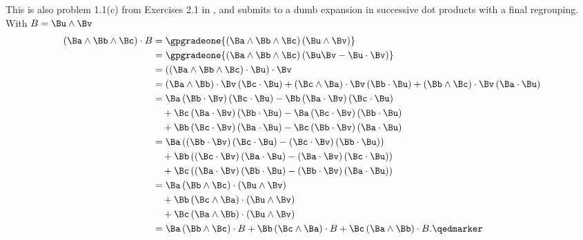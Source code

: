 This is also problem 1.1(c) from Exercises 2.1 in \citep{hestenes1999nfc}, and submits to a dumb expansion in successive dot products with a final regrouping.  With \(B = \Bu \wedge \Bv\)
%
\begin{equation}\label{eqn:stokesTheoremGeometricAlgebra:2860}
\begin{aligned}
\left(  \Ba \wedge \Bb \wedge \Bc  \right)
\cdot B
&=
\gpgradeone{
\left(  \Ba \wedge \Bb \wedge \Bc \right)
 \left( \Bu \wedge \Bv \right) } \\
&=
\gpgradeone{
\left(  \Ba \wedge \Bb \wedge \Bc  \right)
\left(
\Bu \Bv
- \Bu \cdot \Bv
\right) } \\
&=
\left(
\left(  \Ba \wedge \Bb \wedge \Bc  \right)
 \cdot \Bu \right) \cdot \Bv \\
&=
\left( \Ba \wedge \Bb \right) \cdot \Bv \left( \Bc \cdot \Bu \right)
+
\left( \Bc \wedge \Ba \right) \cdot \Bv \left( \Bb \cdot \Bu \right)
+
\left( \Bb \wedge \Bc \right) \cdot \Bv \left( \Ba \cdot \Bu \right) \\
&=
\Ba
\left(  \Bb \cdot \Bv  \right)
\left( \Bc \cdot \Bu \right)
-\Bb
\left(  \Ba \cdot \Bv  \right)
\left( \Bc \cdot \Bu \right) \\
&\quad +
\Bc
\left(  \Ba \cdot \Bv  \right)
\left( \Bb \cdot \Bu \right)
-
\Ba
\left(  \Bc \cdot \Bv  \right)
\left( \Bb \cdot \Bu \right) \\
&\quad +
\Bb
\left(  \Bc \cdot \Bv  \right)
\left( \Ba \cdot \Bu \right)
-
\Bc
\left(  \Bb \cdot \Bv  \right)
\left( \Ba \cdot \Bu \right) \\
&=
\Ba
\left(  \left(  \Bb \cdot \Bv  \right) \left( \Bc \cdot \Bu \right) - \left(  \Bc \cdot \Bv  \right) \left( \Bb \cdot \Bu \right)  \right)
\\
&\quad +
\Bb
\left(  \left(  \Bc \cdot \Bv  \right) \left( \Ba \cdot \Bu \right) - \left(  \Ba \cdot \Bv  \right) \left( \Bc \cdot \Bu \right)  \right)
\\
&\quad +
\Bc
\left(  \left(  \Ba \cdot \Bv  \right) \left( \Bb \cdot \Bu \right) - \left(  \Bb \cdot \Bv  \right) \left( \Ba \cdot \Bu \right)  \right)
 \\
&=
\Ba
\left(  \Bb \wedge \Bc  \right)
\cdot
\left(  \Bu \wedge \Bv  \right)
\\
&\quad +
\Bb
\left(  \Bc \wedge \Ba  \right)
\cdot
\left(  \Bu \wedge \Bv  \right)
\\
&\quad +
\Bc
\left(  \Ba \wedge \Bb  \right)
 \cdot
\left(  \Bu \wedge \Bv  \right)
\\
&=
\Ba
\left(  \Bb \wedge \Bc  \right)
\cdot B
+
\Bb
\left(  \Bc \wedge \Ba  \right)
 \cdot B
+
\Bc
\left(  \Ba \wedge \Bb  \right)
\cdot B. \qedmarker
\end{aligned}
\end{equation}

